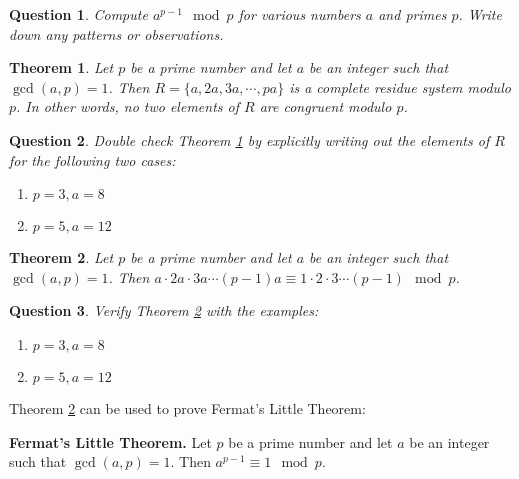 \documentclass[12pt]{amsart}
\theoremstyle{plain}
\newtheorem{thm}{Theorem}
\newtheorem{quest}{Question}
\theoremstyle{definition}
\theoremstyle{remark}
\begin{document}
\begin{quest} \label{Q3}
Compute $a^{p-1} \mod p$ for various numbers $a$ and primes $p$.  Write down any patterns or observations.
\end{quest}

\newpage
\begin{thm} \label{T4}
Let $p$ be a prime number and let $a$ be an integer such that $\gcd(a,p) = 1$.  Then $R = \{a,2a,3a, \cdots, pa\}$ is a complete residue system modulo $p$.  In other words, no two elements of $R$ are congruent modulo $p$.
\end{thm}

\begin{quest} \label{Q4}
Double check Theorem \ref{T4} by explicitly writing out the elements of $R$ for the following two cases:
\begin{enumerate}[1.]
	\item $p = 3, a = 8$\\ \vspace{1in}
	\item $p = 5, a = 12$\\ \vspace{1.5in}
\end{enumerate}
\end{quest}

\begin{thm} \label{T5}
Let $p$ be a prime number and let $a$ be an integer such that $\gcd(a,p) = 1$.  Then $a \cdot 2a \cdot 3a \cdots (p-1)a \equiv 1\cdot 2 \cdot 3 \cdots (p-1) \mod p$.
\end{thm}
\begin{quest} \label{Q4}
Verify Theorem \ref{T5} with the examples:
\begin{enumerate}[1.]
	\item $p = 3, a = 8$\\ \vspace{1.5in}
	\newpage \item $p = 5, a = 12$\\ \vspace{2in}
\end{enumerate}
\end{quest}


Theorem \ref{T5} can be used to prove Fermat's Little Theorem:

\noindent\textbf{Fermat's Little Theorem.} Let $p$ be a prime number and let $a$ be an integer such that $\gcd(a,p) = 1$. Then $a^{p-1} \equiv 1 \mod p$.

\vspace{1in}
\end{document}
